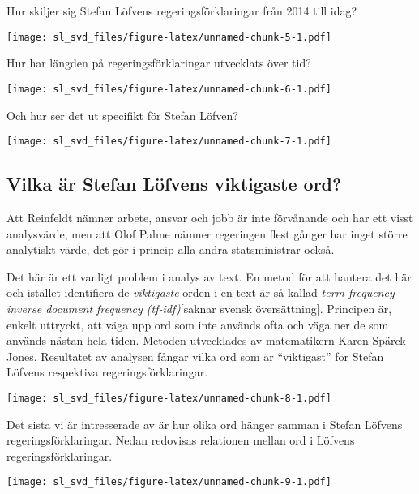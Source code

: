 \documentclass[]{article}
\begin{document}
Hur skiljer sig Stefan Löfvens regeringsförklaringar från 2014 till
idag?

\texttt{[image: sl\_svd\_files/figure-latex/unnamed-chunk-5-1.pdf]}

Hur har längden på regeringsförklaringar utvecklats över tid?

\texttt{[image: sl\_svd\_files/figure-latex/unnamed-chunk-6-1.pdf]}

Och hur ser det ut specifikt för Stefan Löfven?

\texttt{[image: sl\_svd\_files/figure-latex/unnamed-chunk-7-1.pdf]}

\hypertarget{vilka-ar-stefan-lofvens-viktigaste-ord}{%
\subsection{Vilka är Stefan Löfvens viktigaste
ord?}\label{vilka-ar-stefan-lofvens-viktigaste-ord}}

Att Reinfeldt nämner arbete, ansvar och jobb är inte förvånande och har
ett visst analysvärde, men att Olof Palme nämner regeringen flest gånger
har inget större analytiskt värde, det gör i princip alla andra
statsministrar också.

Det här är ett vanligt problem i analys av text. En metod för att
hantera det här och istället identifiera de \emph{viktigaste} orden i en
text är så kallad \emph{term frequency--inverse document frequency
(tf-idf)}{[}saknar svensk översättning{]}. Principen är, enkelt
uttryckt, att väga upp ord som inte används ofta och väga ner de som
används nästan hela tiden. Metoden utvecklades av matematikern Karen
Spärck Jones. Resultatet av analysen fångar vilka ord som är
``viktigast'' för Stefan Löfvens respektiva regeringsförklaringar.

\texttt{[image: sl\_svd\_files/figure-latex/unnamed-chunk-8-1.pdf]}

Det sista vi är intresserade av är hur olika ord hänger samman i Stefan
Löfvens regeringsförklaringar. Nedan redovisas relationen mellan ord i
Löfvens regeringsförklaringar.

\texttt{[image: sl\_svd\_files/figure-latex/unnamed-chunk-9-1.pdf]}
\end{document}
